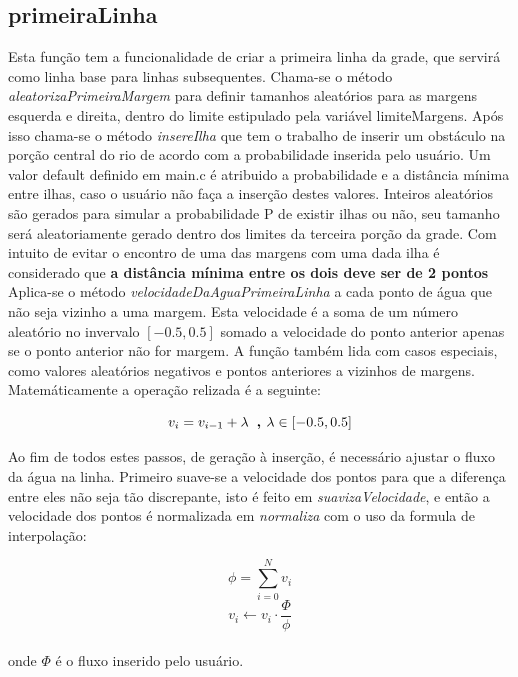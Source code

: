 \documentclass[a4paper,11pt]{article}
\begin{document}
\subsection{primeiraLinha}
Esta fun\c{c}ão tem a funcionalidade de criar a primeira linha da grade, que servirá como linha base para linhas subsequentes. Chama-se o método \textit{aleatorizaPrimeiraMargem} para definir tamanhos aleatórios para as margens esquerda e direita, dentro do limite estipulado pela variável limiteMargens. Após isso chama-se o método \textit{insereIlha} que tem o trabalho de inserir um obstáculo na por\c{c}ão central do rio de acordo com a probabilidade inserida pelo usuário. Um valor default definido em main.c é atribuido a probabilidade e a distância mínima entre ilhas, caso o usuário não fa\c{c}a a inser\c{c}ão destes valores. Inteiros aleatórios são gerados para simular a probabilidade P de existir ilhas ou não, seu tamanho será aleatoriamente gerado dentro dos limites da terceira por\c{c}ão da grade. Com intuito de evitar o encontro de uma das margens com uma dada ilha é considerado que \textbf{a distância mínima entre os dois deve ser de 2 pontos}
Aplica-se o método \textit{velocidadeDaAguaPrimeiraLinha} a cada ponto de água que não seja vizinho a uma margem. Esta velocidade é a soma de um número aleatório no invervalo $[-0.5,0.5]$ somado a velocidade do ponto anterior apenas se o ponto anterior não for margem. A fun\c{c}ão também lida com casos especiais, como valores aleatórios negativos e pontos anteriores a vizinhos de margens. Matemáticamente a opera\c{c}ão relizada é a seguinte:

\begin{equation}
v_i = v_{i-1} + \lambda \textbf{\, , } \lambda \in [-0.5,0.5]
\end{equation}

Ao fim de todos estes passos, de gera\c{c}ão à inser\c{c}ão, é necessário ajustar o fluxo da água na linha. Primeiro suave-se a velocidade dos pontos	 para que a diferen\c{c}a entre eles não seja tão discrepante, isto é feito em \textit{suavizaVelocidade}, e então a velocidade dos pontos é normalizada em \textit{normaliza} com o uso da formula de interpola\c{c}ão: 

\begin{equation}
\phi = \sum_{i=0}^{N} v_i
\end{equation}
\begin{equation}
v_i \leftarrow v_i\cdot\dfrac{\Phi}{\phi}
\end{equation}
\\
onde $\Phi$ é o fluxo inserido pelo usuário.
\end{document}
